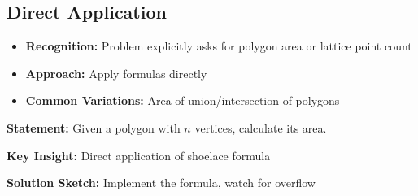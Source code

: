 
\subsection{Direct Application}

\begin{pattern}
    \begin{itemize}
        \item \textbf{Recognition:} Problem explicitly asks for polygon area or lattice point count
        \item \textbf{Approach:} Apply formulas directly
        \item \textbf{Common Variations:} Area of union/intersection of polygons
    \end{itemize}
\end{pattern}

\begin{problemenv}
\item \textbf{Statement:} Given a polygon with $n$ vertices, calculate its area.
\item \textbf{Key Insight:} Direct application of shoelace formula
\item \textbf{Solution Sketch:} Implement the formula, watch for overflow
\end{problemenv} 